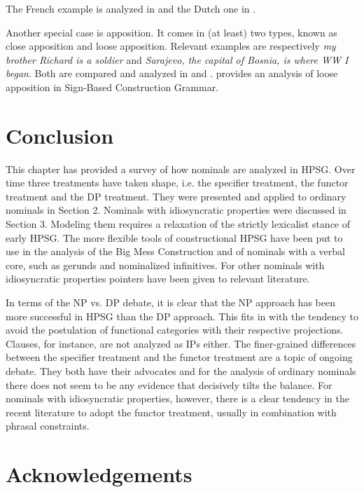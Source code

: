 \documentclass[output=paper]{langsci/langscibook}
\begin{document}
\noindent
The French example is analyzed in \citet[20--21]{Abeilleetal04} and the Dutch one in 
\citet[47--50]{VanEynde04}. 

Another special case is apposition. It comes in (at least) two types, known as 
close apposition and loose apposition. Relevant examples are respectively 
\emph{my brother Richard is a soldier} and \emph{Sarajevo, the capital of Bosnia, is where WW I began}.
Both are compared and analyzed in \citet{Kim12} and \citet{Kim14}. 
\citet{VanEyndeKim16} provides an analysis of loose apposition in
Sign-Based Construction Grammar. 



\section{Conclusion} 


This chapter has provided a survey of how nominals are analyzed in HPSG. 
Over time three treatments have taken shape, i.e. the specifier treatment, 
the functor treatment and the DP treatment. They were presented and applied to ordinary 
nominals in Section 2. Nominals with idiosyncratic properties were discussed in Section 3.
Modeling them requires a relaxation of the strictly lexicalist stance of early HPSG.  
The more flexible tools of constructional HPSG have been put to use in the analysis 
of the Big Mess Construction and of nominals with a verbal core, such as gerunds and 
nominalized infinitives. For other nominals with idiosyncratic properties pointers 
have been given to relevant literature. 

In terms of the NP vs. DP debate, it is clear that the NP approach has been 
more successful in HPSG than the DP approach. This fits in with the tendency to 
avoid the postulation of functional categories with their respective projections. 
Clauses, for instance, are not analyzed as IPs either. The finer-grained 
differences between the specifier treatment and the functor treatment are 
a topic of ongoing debate. They both have their advocates and for the analysis of 
ordinary nominals there does not seem to be any evidence that decisively tilts the balance. 
For nominals with idiosyncratic properties, however, there is a clear tendency in the recent 
literature to adopt the functor treatment, usually in combination with phrasal constraints.    


 
\section*{Acknowledgements}

\printbibliography[heading=subbibliography,notkeyword=this] 
\end{document}
